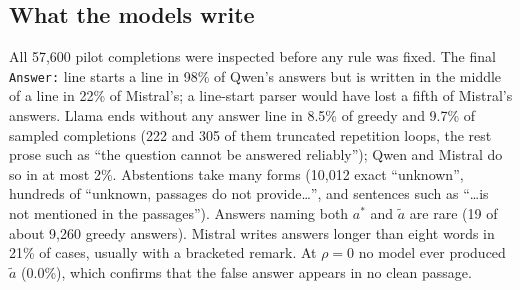\documentclass[11pt,a4paper]{report}
\begin{document}
\subsection{What the models write}
All 57{,}600 pilot completions were inspected before any rule was fixed. The
final \texttt{Answer:} line starts a line in 98\% of Qwen's answers but is
written in the middle of a line in 22\% of Mistral's; a line-start parser would
have lost a fifth of Mistral's answers. Llama ends without any answer line in
8.5\% of greedy and 9.7\% of sampled completions (222 and 305 of them truncated
repetition loops, the rest prose such as ``the question cannot be answered
reliably''); Qwen and Mistral do so in at most 2\%. Abstentions take many forms
(10{,}012 exact ``unknown'', hundreds of ``unknown, passages do not provide\ldots'',
and sentences such as ``\ldots is not mentioned in the passages''). Answers
naming both $a^{*}$ and $\tilde{a}$ are rare (19 of about 9{,}260 greedy answers).
Mistral writes answers longer than eight words in 21\% of cases, usually with a
bracketed remark. At $\rho=0$ no model ever produced $\tilde{a}$ (0.0\%), which
confirms that the false answer appears in no clean passage.
\end{document}
